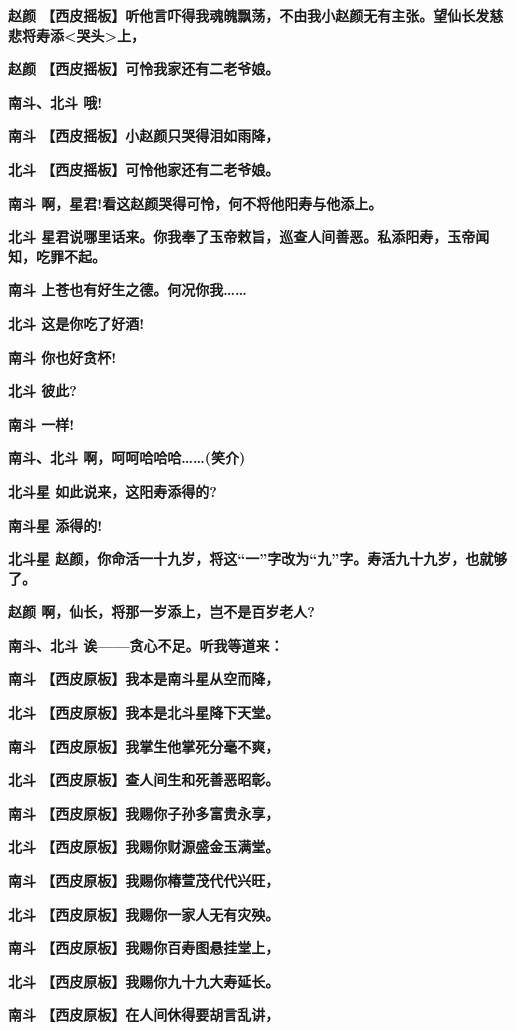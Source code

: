 \textbf{赵颜
【西皮摇板】听他言吓得我魂魄飘荡，不由我小赵颜无有主张。望仙长发慈悲将寿添\textless{}哭头\textgreater{}上，}

\textbf{赵颜 【西皮摇板】可怜我家还有二老爷娘。}

\textbf{南斗、北斗 哦!}

\textbf{南斗 【西皮摇板】小赵颜只哭得泪如雨降，}

\textbf{北斗 【西皮摇板】可怜他家还有二老爷娘。}

\textbf{南斗 啊，星君!看这赵颜哭得可怜，何不将他阳寿与他添上。}

\textbf{北斗
星君说哪里话来。你我奉了玉帝敕旨，巡查人间善恶。私添阳寿，玉帝闻知，吃罪不起。}

\textbf{南斗 上苍也有好生之德。何况你我\ldots{}\ldots{}}

\textbf{北斗 这是你吃了好酒!}

\textbf{南斗 你也好贪杯!}

\textbf{北斗 彼此?}

\textbf{南斗 一样!}

\textbf{南斗、北斗 啊，呵呵哈哈哈\ldots{}\ldots{}(笑介)}

\textbf{北斗星 如此说来，这阳寿添得的?}

\textbf{南斗星 添得的!}

\textbf{北斗星
赵颜，你命活一十九岁，将这``一''字改为``九''字。寿活九十九岁，也就够了。}

\textbf{赵颜 啊，仙长，将那一岁添上，岂不是百岁老人?}

\textbf{南斗、北斗 诶------贪心不足。听我等道来：}

\textbf{南斗 【西皮原板】我本是南斗星从空而降，}

\textbf{北斗 【西皮原板】我本是北斗星降下天堂。}

\textbf{南斗 【西皮原板】我掌生他掌死分毫不爽，}

\textbf{北斗 【西皮原板】查人间生和死善恶昭彰。}

\textbf{南斗 【西皮原板】我赐你子孙多富贵永享，}

\textbf{北斗 【西皮原板】我赐你财源盛金玉满堂。}

\textbf{南斗 【西皮原板】我赐你椿萱茂代代兴旺，}

\textbf{北斗 【西皮原板】我赐你一家人无有灾殃。}

\textbf{南斗 【西皮原板】我赐你百寿图悬挂堂上，}

\textbf{北斗 【西皮原板】我赐你九十九大寿延长。}

\textbf{南斗 【西皮原板】在人间休得要胡言乱讲，}

